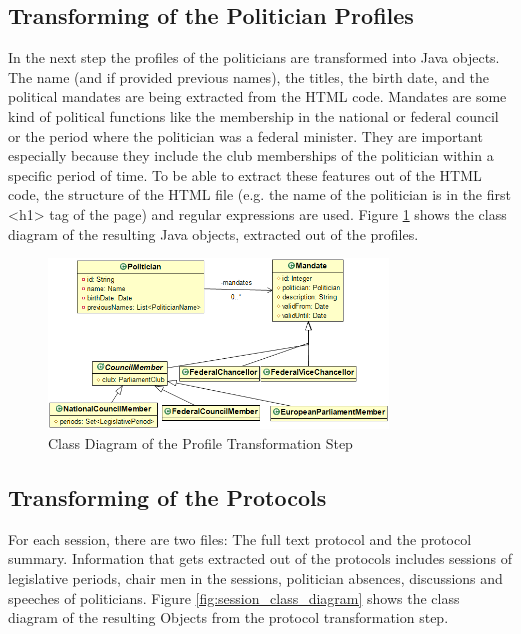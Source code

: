 \subsection{Transforming of the Politician Profiles}
In the next step the profiles of the politicians are transformed into Java objects. 
The name (and if provided previous names), the titles, the birth date, and the political mandates are being extracted from the HTML code. Mandates are some kind of political functions like the membership in the national or federal council or the period where the politician was a federal minister. They are important especially because they include the club memberships of the politician within a specific period of time. To be able to extract these features out of the HTML code, the structure of the HTML file (e.g. the name of the politician is in the first <h1> tag of the page) and regular expressions are used. Figure \ref{fig:politicians_mandates_class_diagram} shows the class diagram of the resulting Java objects, extracted out of the profiles.


\begin{figure}
	\centering
	\includegraphics[width=341px]{imgs/politicians_mandates_class_diagram}
	\caption{Class Diagram of the Profile Transformation Step}
	\label{fig:politicians_mandates_class_diagram}
\end{figure}

\subsection{Transforming of the Protocols}
For each session, there are two files: The full text protocol and the protocol summary. Information that gets extracted out of the protocols includes sessions of legislative periods, chair men in the sessions, politician absences, discussions and speeches of politicians. Figure \ref{fig:session_class_diagram} shows the class diagram of the resulting Objects from the protocol transformation step.

